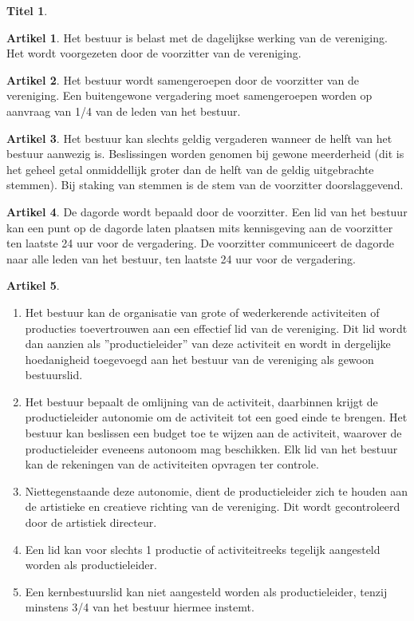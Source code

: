 \documentclass[a4paper,10pt]{article}
\theoremstyle{definition}
\newtheorem{titel}{\newline\Large Titel}
\newtheorem{artikel}{\large Artikel}
\newcommand{\ttextcr}{\hfill\newline}
\newcommand{\ttextenum}{\mbox{}}
\begin{document}
\begin{titel}
  \begin{artikel}\ttextcr
    Het bestuur is belast met de dagelijkse werking van de vereniging.
    Het wordt voorgezeten door de voorzitter van de vereniging.
  \end{artikel}

  \begin{artikel}\ttextcr
    Het bestuur wordt samengeroepen door de voorzitter van de vereniging.
    Een buitengewone vergadering moet samengeroepen worden op aanvraag van 1/4 van de leden van het bestuur.
  \end{artikel}

  \begin{artikel}\ttextcr
    Het bestuur kan slechts geldig vergaderen wanneer de helft van het bestuur aanwezig is.
    Beslissingen worden genomen bij gewone meerderheid (dit is het geheel getal onmiddellijk groter dan de helft van de geldig uitgebrachte stemmen).
    Bij staking van stemmen is de stem van de voorzitter doorslaggevend.
  \end{artikel}

  \begin{artikel}\ttextcr
    De dagorde wordt bepaald door de voorzitter.
    Een lid van het bestuur kan een punt op de dagorde laten plaatsen mits kennisgeving aan de voorzitter ten laatste 24 uur voor de vergadering.
    De voorzitter communiceert de dagorde naar alle leden van het bestuur, ten laatste 24 uur voor de vergadering.
  \end{artikel}

  \begin{artikel}\label{bestuur-productie}\ttextenum
    \begin{enumerate}
      \item
        Het bestuur kan de organisatie van grote of wederkerende activiteiten of producties toevertrouwen aan een effectief lid van de vereniging.
        Dit lid wordt dan aanzien als ''productieleider'' van deze activiteit en wordt in dergelijke hoedanigheid toegevoegd aan het bestuur van de vereniging als gewoon bestuurslid.
      \item
        Het bestuur bepaalt de omlijning van de activiteit, daarbinnen krijgt de productieleider autonomie om de activiteit tot een goed einde te brengen.
        Het bestuur kan beslissen een budget toe te wijzen aan de activiteit, waarover de productieleider eveneens autonoom mag beschikken.
        Elk lid van het bestuur kan de rekeningen van de activiteiten opvragen ter controle.
      \item
        Niettegenstaande deze autonomie, dient de productieleider zich te houden aan de artistieke en creatieve richting van de vereniging.
        Dit wordt gecontroleerd door de artistiek directeur.
      \item
        Een lid kan voor slechts 1 productie of activiteitreeks tegelijk aangesteld worden als productieleider.
      \item
        Een kernbestuurslid kan niet aangesteld worden als productieleider, tenzij minstens 3/4 van het bestuur hiermee instemt.
    \end{enumerate}
  \end{artikel}
    

\end{titel}
\end{document}
